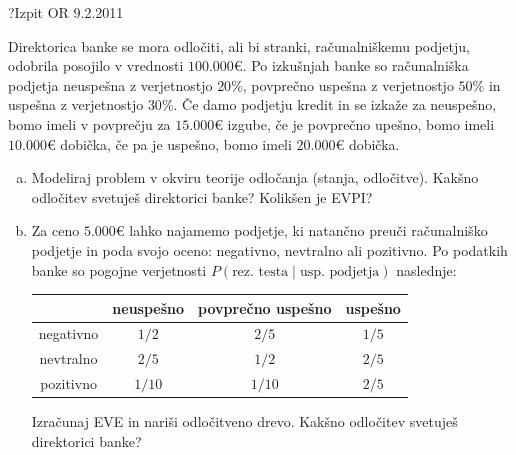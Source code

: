 \begin{naloga}{?}{Izpit OR 9.2.2011}
\begin{vprasanje}
Direktorica banke se mora odločiti, ali bi stranki, računalniškemu podjetju,
odobrila posojilo v vrednosti $100.000 €$.
Po izkušnjah banke so računalniška podjetja neuspešna z verjetnostjo $20 \%$,
povprečno uspešna z verjetnostjo $50 \%$ in uspešna z verjetnostjo $30 \%$.
Če damo podjetju kredit in se izkaže za neuspešno,
bomo imeli v povprečju za $15.000 €$ izgube,
če je povprečno upešno, bomo imeli $10.000 €$ dobička,
če pa je uspešno, bomo imeli $20.000 €$ dobička.
\begin{enumerate}[(a)]
\item Modeliraj problem v okviru teorije odločanja (stanja, odločitve).
Kakšno odločitev svetuješ direktorici banke?
Kolikšen je EVPI?

\item Za ceno $5.000 €$ lahko najamemo podjetje,
ki natančno preuči računalniško podjetje in poda svojo oceno:
negativno, nevtralno ali pozitivno.
Po podatkih banke so pogojne verjetnosti
$P(\text{rez.~testa} \;|\; \text{usp.~podjetja})$ naslednje:
\begin{center}
\begin{tabular}{c|ccc}
& neuspešno & povprečno uspešno & uspešno \\ \hline
negativno & $1/2$  & $2/5$  & $1/5$ \\
nevtralno & $2/5$  & $1/2$  & $2/5$ \\
pozitivno & $1/10$ & $1/10$ & $2/5$
\end{tabular}
\end{center}
Izračunaj EVE in nariši odločitveno drevo.
Kakšno odločitev svetuješ direktorici banke?
\end{enumerate}
\end{vprasanje}
\begin{odgovor}
\end{odgovor}
\end{naloga}
